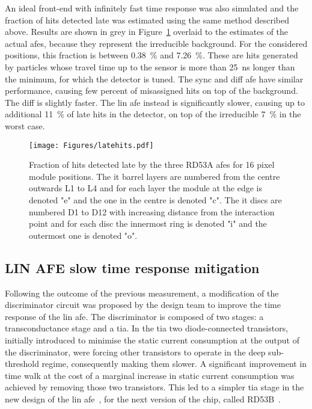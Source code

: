 An ideal front-end with infinitely fast time response was also simulated %
and the fraction of hits detected late was estimated using the same method described above. Results are shown in grey in Figure~\ref{fig:tor_late_hits} overlaid to the estimates of the actual \acrlong{afe}s, because they represent the irreducible background. For the considered positions, this fraction is between \SI{0.38}{\percent} and \SI{7.26}{\percent}.
These are hits generated by particles whose travel time up to the sensor is more than \SI{25}{\nano\second} longer than the minimum, for which the detector is tuned. 
The \gls{sync} and \gls{diff} \gls{afe} have similar performance, causing few percent of misassigned hits on top of the background. The \gls{diff} is slightly faster.
The \gls{lin} \gls{afe} instead is significantly slower, causing up to additional \SI{11}{\percent} of late hits in the detector, on top of the irreducible \SI{7}{\percent} in the worst case.

\begin{figure}[t]
    \centering
    \texttt{[image: Figures/latehits.pdf]}
    \caption{Fraction of hits detected late by the three RD53A \glspl{afe} for 16 pixel module positions. The \gls{it} barrel layers are numbered from the centre outwards L1 to L4 and for each layer the module at the edge is denoted "e" and the one in the centre is denoted "c". The \gls{it} discs are numbered D1 to D12 with increasing distance from the interaction point and for each disc the innermost ring is denoted "i" and the outermost one is denoted "o".}
    \label{fig:tor_late_hits}
\end{figure}

\subsection*{LIN AFE slow time response mitigation}

Following the outcome of the previous measurement, a modification of the discriminator circuit was proposed by the design team to improve the time response of the \gls{lin} \gls{afe}. 
The discriminator is composed of two stages: a transconductance stage and a \acrfull{tia}. In the \gls{tia} two diode-connected transistors, initially introduced to minimise the static current consumption at the output of the discriminator, were forcing other transistors to operate in the deep sub-threshold regime, consequently making them slower. A significant improvement in time walk at the cost of a marginal increase in static current consumption was achieved by removing those two transistors. This led to a simpler \gls{tia} stage in the new design of the \gls{lin} \gls{afe}~\citep{new_lin}, for the next version of the chip, called RD53B~\citep{rd53b_manual}.

